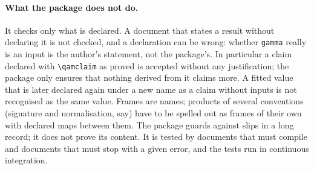 \paragraph{What the package does not do.}  It checks only what is declared.  A document that states a result without declaring it is
not checked, and a declaration can be wrong: whether \texttt{gamma} really is an input is the author's statement, not the package's.
In particular a claim declared with \verb|\qamclaim| as proved is accepted without any justification; the package only ensures that
nothing derived from it claims more.  A fitted value that is later declared again under a new name as a claim without inputs is not
recognised as the same value.  Frames are names; products of several conventions (signature and normalisation, say) have to be
spelled out as frames of their own with declared maps between them.
The package guards against slips in a long record; it does not prove its content.  It is tested by documents that must compile and
documents that must stop with a given error, and the tests run in continuous integration.
